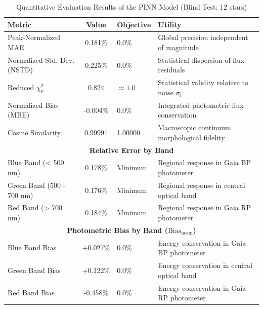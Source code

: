 
\begin{table}[htpb]
\centering
\caption{Quantitative Evaluation Results of the PINN Model (Blind Test: 12 stars)}
\label{tab:pinn_evaluation}
\begin{tabular}{lcll}
\hline
\textbf{Metric} & \textbf{Value} & \textbf{Objective} & \textbf{Utility} \\
\hline
Peak-Normalized MAE & 0.181\% & 0.0\% & Global precision independent of magnitude \\
Normalized Std. Dev. (NSTD) & 0.225\% & 0.0\% & Statistical dispersion of flux residuals \\
Reduced $\chi^2_\nu$ & 0.824 & $\approx 1.0$ & Statistical validity relative to noise $\sigma_i$ \\
Normalized Bias (MBE) & -0.004\% & 0.0\% & Integrated photometric flux conservation \\
Cosine Similarity & 0.99991 & 1.00000 & Macroscopic continuum morphological fidelity \\
\hline
\multicolumn{4}{c}{\textbf{Relative Error by Band}} \\
\hline
Blue Band (< 500 nm) & 0.178\% & Minimum & Regional response in Gaia BP photometer \\
Green Band (500 - 700 nm) & 0.176\% & Minimum & Regional response in central optical band \\
Red Band (> 700 nm) & 0.184\% & Minimum & Regional response in Gaia RP photometer \\
\hline
\multicolumn{4}{c}{\textbf{Photometric Bias by Band ($\text{Bias}_{\text{norm}}$)}} \\
\hline
Blue Band Bias & +0.027\% & 0.0\% & Energy conservation in Gaia BP photometer \\
Green Band Bias & +0.122\% & 0.0\% & Energy conservation in central optical band \\
Red Band Bias & -0.458\% & 0.0\% & Energy conservation in Gaia RP photometer \\
\hline
\end{tabular}
\end{table}
